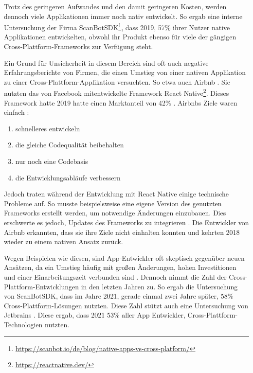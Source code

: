 Trotz des geringeren Aufwandes und den damit geringeren Kosten, werden dennoch viele Applikationen immer noch nativ entwickelt. So ergab eine interne Untersuchung der Firma ScanBotSDK\footnote{\label{scanbot_footnote}\url{https://scanbot.io/de/blog/native-apps-vs-cross-platform/}}, dass 2019, 57\% ihrer Nutzer native Applikationen entwickelten, obwohl ihr Produkt ebenso für viele der gängigen Cross-Plattform-Frameworks zur Verfügung steht.

Ein Grund für Unsicherheit in diesem Bereich sind oft auch negative Erfahrungsberichte von Firmen, die einen Umstieg von einer nativen Applikation zu einer Cross-Plattform-Applikation versuchten. So etwa auch Airbnb \cite{Airbnb_react_goals}. Sie nutzten das von Facebook mitentwickelte Framework React Native\footnote{\url{https://reactnative.dev/}}. Dieses Framework hatte 2019 hatte einen Marktanteil von 42\% \cite{statist_CP_Framework}. 
\break
Airbnbs Ziele waren einfach \cite{statist_CP_Framework}:
\begin{enumerate}%
    \item schnelleres entwickeln
    \item die gleiche Codequalität beibehalten
    \item nur noch eine Codebasis
    \item die Entwicklungsabläufe verbessern
\end{enumerate}
\nointerlineskip
Jedoch traten während der Entwicklung mit React Native einige technische Probleme auf. So musste beispielsweise eine eigene Version des genutzten Frameworks erstellt werden, um notwendige Änderungen einzubauen. Dies erschwerte es jedoch, Updates des Frameworks zu integrieren \cite{Airbnb_technology}. Die Entwickler von Airbnb erkannten, dass sie ihre Ziele nicht einhalten konnten und kehrten 2018 wieder zu einem nativen Ansatz zurück.

Wegen Beispielen wie diesen, sind App-Entwickler oft skeptisch gegenüber neuen Ansätzen, da ein Umstieg häufig mit großen Änderungen, hohen Investitionen und einer Einarbeitungszeit verbunden sind \cite{medium_Lehtimäki}. Dennoch nimmt die Zahl der Cross-Plattform-Entwicklungen in den letzten Jahren zu. 
So ergab die Untersuchung von ScanBotSDK, dass im Jahre 2021, gerade einmal zwei Jahre später, 58\% Cross-Plattform-Lösungen nutzten. Diese Zahl stützt auch eine Untersuchung von Jetbrains \cite{JetBrains_miscellaneous_2021}. Diese ergab, dass 2021 53\% aller App Entwickler, Cross-Plattform-Technologien nutzten.

